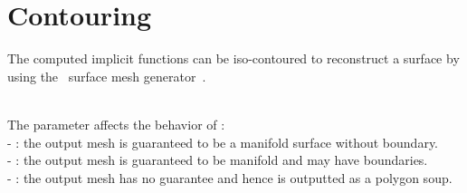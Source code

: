 \section{Contouring}

The computed implicit functions can be iso-contoured to reconstruct a surface by using the \cgal\ surface mesh generator~\cite{cgal:ry-gsddrm-06,cgal:bo-pgsms-05}.

  \\

The parameter  affects the behavior of : \\
- : the output mesh is guaranteed to be a manifold surface without boundary.\\
- : the output mesh is guaranteed to be manifold and may have boundaries.\\
- : the output mesh has no guarantee and hence is outputted as a polygon soup.